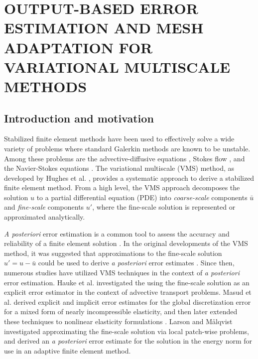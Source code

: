\chapter{OUTPUT-BASED ERROR ESTIMATION AND MESH ADAPTATION
FOR VARIATIONAL MULTISCALE METHODS}
\label{chap:vms}

\let\thefootnote\relax{}

\section{Introduction and motivation}

Stabilized finite element methods have been used to
effectively solve a wide variety of problems where
standard Galerkin methods are known to be unstable.
Among these problems are the advective-diffusive
equations \cite{franca1992stabilized, hughes1989new},
Stokes flow \cite{hughes1986new, barth2004taxonomy},
and the Navier-Stokes equations \cite{brooks1982streamline,
franca1992stabilizedii, tezduyar1992incompressible}.
The variational multiscale (VMS) method, as developed
by Hughes et al. \cite{hughes1998variational,
hughes2007variational}, provides a systematic approach
to derive a stabilized finite element method. From
a high level, the VMS approach decomposes the solution
$u$ to a partial differential equation (PDE) into
\emph{coarse-scale} components $\bar{u}$ and
\emph{fine-scale} components $u'$,
where the fine-scale solution is represented or
approximated analytically.

\emph{A posteriori} error estimation is a common
tool to assess the accuracy and reliability of a
finite element solution \cite{ainsworth2011posteriori}.
In the original developments
of the VMS method, it was suggested that approximations
to the  fine-scale solution $u' = u - \bar{u}$
could be used to derive \emph{a posteriori} error
estimates \cite{hughes1998variational}. Since then,
numerous studies have utilized VMS techniques in
the context of \emph{a posteriori} error estimation.
Hauke et al. \cite{hauke2006multiscale, hauke2008variational}
investigated the using the fine-scale solution as
an explicit error estimator in the context
of advective transport problems. 
Masud et al. \cite{masud2011variational} derived explicit
and implicit error estimates for the global discretization
error for a mixed form of nearly incompressible elasticity,
and then later extended these techniques to nonlinear
elasticity formulations \cite{masud2013framework}.
Larson and M{\aa}lqvist
\cite{larson2007adaptive}
investigated approximating
the fine-scale solution via local patch-wise problems,
and derived an \emph{a posteriori} error estimate
for the solution in the energy norm for use in
an adaptive finite element method.


